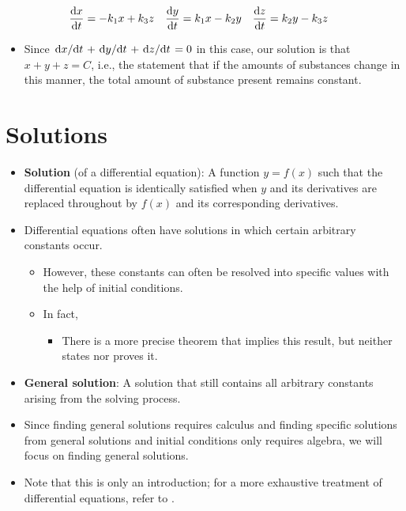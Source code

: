 \documentclass[../main.tex]{subfiles}
\begin{document}
\begin{itemize}
    \begin{align*}
        \dv{x}{t} &= -k_1x+k_3z&
        \dv{y}{t} &= k_1x-k_2y&
        \dv{z}{t} &= k_2y-k_3z
    \end{align*}
    \begin{itemize}
        \item Since $\dv*{x}{t}+\dv*{y}{t}+\dv*{z}{t}=0$ in this case, our solution is that $x+y+z=C$, i.e., the statement that if the amounts of substances change in this manner, the total amount of substance present remains constant.
    \end{itemize}
\end{itemize}



\section{Solutions}
\begin{itemize}
    \item \textbf{Solution} (of a differential equation): A function $y=f(x)$ such that the differential equation is identically satisfied when $y$ and its derivatives are replaced throughout by $f(x)$ and its corresponding derivatives.
    \item Differential equations often have solutions in which certain arbitrary constants occur.
    \begin{itemize}
        \item However, these constants can often be resolved into specific values with the help of initial conditions.
        \item In fact, 
        \begin{itemize}
            \item There is a more precise theorem that implies this result, but \textcite{bib:Thomas} neither states nor proves it.
        \end{itemize}
    \end{itemize}
    \item \textbf{General solution}: A solution that still contains all arbitrary constants arising from the solving process.
    \item Since finding general solutions requires calculus and finding specific solutions from general solutions and initial conditions only requires algebra, we will focus on finding general solutions.
    \item Note that this is only an introduction; for a more exhaustive treatment of differential equations, refer to \textcite{bib:MartinReissner}.
\end{itemize}
\end{document}
